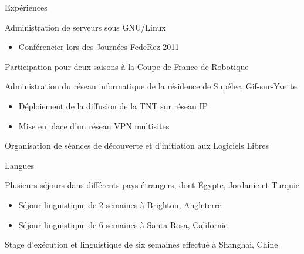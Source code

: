 \begin{supitemize}{Expériences}
		{}
		{
			Administration de serveurs sous GNU/Linux
			\begin{itemize}
				\item Conférencier lors des Journées FedeRez 2011
			\end{itemize}
		}
		{}
		{}
		{Participation pour deux saisons à la Coupe de France de Robotique}
		{
			Administration du réseau informatique de la résidence de Supélec, Gif-sur-Yvette
			\begin{itemize}
				\item Déploiement de la diffusion de la TNT sur réseau IP
				\item Mise en place d'un réseau VPN multisites
			\end{itemize}
		}
		{Organisation de séances de découverte et d'initiation aux Logiciels Libres}
\end{supitemize}

\begin{supitemize}{Langues}
		{
			Plusieurs séjours dans différents pays étrangers, dont \'Egypte, Jordanie et Turquie
			\begin{itemize}
				\item Séjour linguistique de 2 semaines à Brighton, Angleterre
				\item Séjour linguistique de 6 semaines à Santa Rosa, Californie
			\end{itemize}
		}
		{}
		{Stage d'exécution et linguistique de six semaines effectué à Shanghai, Chine}
\end{supitemize}

